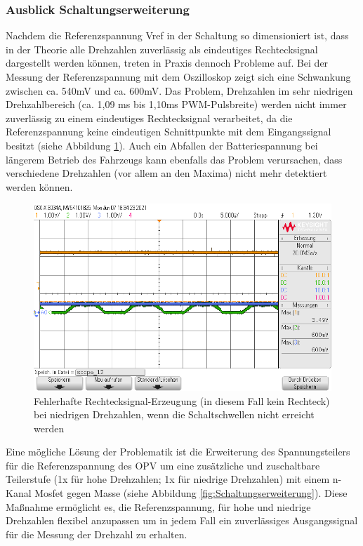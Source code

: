 \newpage
\subsubsection{Ausblick Schaltungserweiterung}\label{Sec4Sub5Sub4}
 
Nachdem die Referenzspannung Vref in der Schaltung so dimensioniert ist, dass in der Theorie alle Drehzahlen zuverlässig als eindeutiges Rechtecksignal dargestellt werden können, treten in Praxis dennoch Probleme auf. Bei der Messung der Referenzspannung mit dem Oszilloskop zeigt sich eine Schwankung zwischen ca. 540mV und ca. 600mV. Das Problem, Drehzahlen im sehr niedrigen Drehzahlbereich (ca. 1,09 ms bis 1,10ms PWM-Pulsbreite) werden nicht immer zuverlässig zu einem eindeutiges Rechtecksignal verarbeitet, da die Referenzspannung keine eindeutigen Schnittpunkte mit dem Eingangssignal besitzt (siehe Abbildung \ref{fig:ProblematikStopThrottle}). Auch ein Abfallen der Batteriespannung bei längerem Betrieb des Fahrzeugs kann ebenfalls das Problem verursachen, dass verschiedene Drehzahlen (vor allem an den Maxima) nicht mehr detektiert werden können.
 
\begin{figure}[H] %
\includegraphics[width=.95\textwidth]{sec4/images/Problematik_stop_throttle} 
\centering
\captionsetup{width=.95\textwidth}
\caption[Fehlerhafte Rechtecksignal-Erzeugung bei niedrigen Drehzahlen]{Fehlerhafte Rechtecksignal-Erzeugung (in diesem Fall kein Rechteck) bei niedrigen Drehzahlen, wenn die Schaltschwellen nicht erreicht werden}\centering
\label{fig:ProblematikStopThrottle}
\end{figure}

Eine mögliche Lösung der Problematik ist die Erweiterung des Spannungsteilers für die Referenzspannung des OPV um eine zusätzliche und zuschaltbare Teilerstufe (1x für hohe Drehzahlen; 1x für niedrige Drehzahlen) mit einem n-Kanal Mosfet gegen Masse (siehe Abbildung \ref{fig:Schaltungserweiterung}). Diese Maßnahme ermöglicht es, die Referenzspannung, für hohe und niedrige Drehzahlen flexibel anzupassen um in jedem Fall ein zuverlässiges Ausgangssignal für die Messung der Drehzahl zu erhalten.\vspace{11pt}

